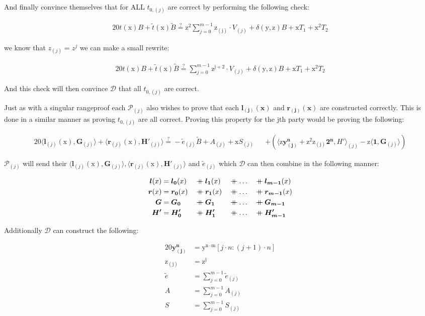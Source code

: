 \documentclass{article}
\newcommand{\eq}[1]{\begin{alignat*}{20}#1\end{alignat*}}
\renewcommand{\vec}[1]{\boldsymbol{#1}}
\newcommand{\ran}[1]{\mathrm{#1}}
\newcommand{\vecran}[1]{\mathbf{#1}}
\renewcommand{\P}{\mathcal{P}}
\newcommand{\D}{\mathcal{D}}
\newcommand\concat{\mathbin{+\mkern-10mu+}} %
\newcommand{\dotp}[2]{\langle #1, #2 \rangle}
\begin{document}
And finally convince themselves that for ALL $t_{0,(j)}$ are correct
by performing the following check:

\eq{
	t(\ran{x})B + \widetilde{t}(\ran{x})\widetilde{B} \stackrel{?}{=} \ran{z^2}\sum^{m-1}_{j = 0} \ran{z_{(j)}} \cdot V_{(j)} + \delta(\ran{y},\ran{z})B + \ran{x}T_1 + \ran{x^2}T_2
}

we know that $z_{(j)} = z^j$ we can make a small rewrite:

\eq{
	t(\ran{x})B + \widetilde{t}(\ran{x})\widetilde{B} \stackrel{?}{=} \sum^{m-1}_{j = 0} \ran{z^{j+2}} \cdot V_{(j)} + \delta(\ran{y},\ran{z})B + \ran{x}T_1 + \ran{x^2}T_2
}


And this check will then convince $\D$ that all $t_{0,(j)}$
are correct.

Just as with a singular rangeproof each $\P_{(j)}$ also wishes to prove
that each $\vec{l_{(j)}(x)}$ and $\vec{r_{(j)}(x)}$ are constructed
correctly. This is done in a similar manner as proving $t_{0,(j)}$
are all correct. Proving this property for the jth party would be
proving the following:

\eq{
	\dotp{\vec{l}_{(j)}(\ran{x})}{\vec{G}_{(j)}} + \dotp{\vec{r}_{(j)}(\ran{x})}{\vec{H'}_{(j)}} \stackrel{?}{=} -\widetilde{e}_{(j)}\widetilde{B} + A_{(j)} + \ran{x}S_{(j)} &&+ (\dotp{\ran{z}\vecran{y^n_{(j)}} + \ran{z^2}\ran{z_{(j)}}\vec{2^n}}{H'}_{(j)} - \ran{z}\dotp{\vec{1}}{\vec{G}_{(j)}})
}

$\P_{(j)}$ will send their $\dotp{\vec{l}_{(j)}(\ran{x})}{\vec{G}_{(j)}},
\dotp{\vec{r}_{(j)}(\ran{x})}{\vec{H'}_{(j)}}$ and $\widetilde{e}_{(j)}$
which $\D$ can then combine in the following manner:

\eq{
	\vec{l}(x) &= \vec{l_0}(x) &&\concat \vec{l_1}(x) &&\concat \dots &&\concat \vec{l_{m-1}}(x)\\
	\vec{r}(x) &= \vec{r_0}(x) &&\concat \vec{r_1}(x) &&\concat \dots &&\concat \vec{r_{m-1}}(x)\\
	\vec{G} &= \vec{G_0} &&\concat \vec{G_1} &&\concat \dots &&\concat \vec{G_{m-1}}\\
	\vec{H'} &= \vec{H'_0} &&\concat \vec{H'_1} &&\concat \dots &&\concat \vec{H'_{m-1}}
}

Additionally $\D$ can construct the following:

\eq{
	\vecran{y^n_{(j)}} &= \ran{y^{n \cdot m}}[j \cdot n : (j+1) \cdot n]\\
	\ran{z_{(j)}} &= \ran{z^j}\\
	\widetilde{e} &= \sum^{m-1}_{j = 0} \widetilde{e}_{(j)}\\
	A &= \sum^{m-1}_{j = 0} A_{(j)}\\
	S &= \sum^{m-1}_{j = 0} S_{(j)}
}
\end{document}
